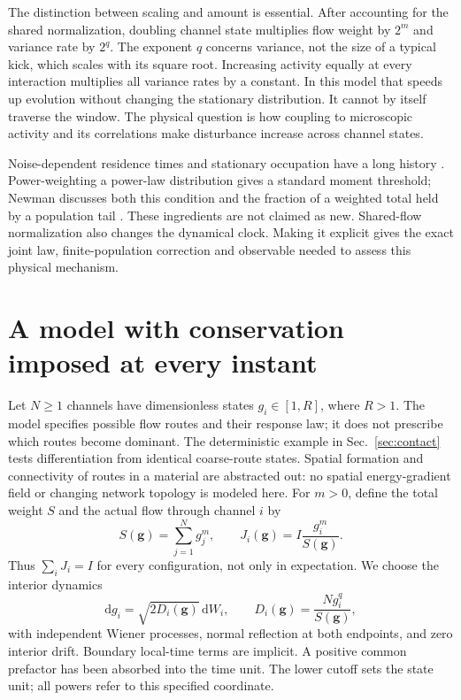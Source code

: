 \documentclass[11pt,a4paper]{article}
\newcommand{\dd}{\mathrm{d}}
\begin{document}
The distinction between scaling and amount is essential. After accounting for
the shared normalization, doubling channel state multiplies flow weight by $2^m$
and variance rate by $2^q$. The exponent $q$ concerns variance, not the size of a
typical kick, which scales with its square root. Increasing activity equally at
every interaction multiplies all variance rates by a constant. In this model that
speeds up evolution without changing the stationary distribution. It cannot by
itself traverse the window. The physical question is how coupling to microscopic activity and its
correlations make disturbance increase across channel states.

Noise-dependent residence times and stationary occupation have a long history
\cite{landauer,maes}. Power-weighting a power-law distribution gives a standard
moment threshold; Newman discusses both this condition and the fraction of a
weighted total held by a population tail \cite{newman}. These ingredients are
not claimed as new. Shared-flow normalization also changes the dynamical clock.
Making it explicit gives the exact joint law, finite-population correction and
observable needed to assess this physical mechanism.

\section{A model with conservation imposed at every instant}

Let $N\geq1$ channels have dimensionless states $g_i\in[1,R]$, where $R>1$.
The model specifies possible flow routes and their response law; it does not
prescribe which routes become dominant. The deterministic example in Sec.~\ref{sec:contact} tests differentiation
from identical coarse-route states.
Spatial formation and connectivity of routes in a material are abstracted out:
no spatial energy-gradient field or changing network topology is modeled here.
For $m>0$, define the total weight $S$ and the actual flow through channel $i$ by
\begin{equation}
 S(\mathbf g)=\sum_{j=1}^N g_j^m,\qquad
 J_i(\mathbf g)=I\frac{g_i^m}{S(\mathbf g)}.
 \label{eq:share}
\end{equation}
Thus $\sum_i J_i=I$ for every configuration, not only in expectation. We choose
the interior dynamics
\begin{equation}
 \dd g_i=\sqrt{2D_i(\mathbf g)}\,\dd W_i,\qquad
 D_i(\mathbf g)=\frac{N g_i^q}{S(\mathbf g)},
 \label{eq:model}
\end{equation}
with independent Wiener processes, normal reflection at both endpoints, and
zero interior drift. Boundary local-time terms are implicit. A positive common
prefactor has been absorbed into the time unit. The lower cutoff sets the state
unit; all powers refer to this specified coordinate.
\end{document}
